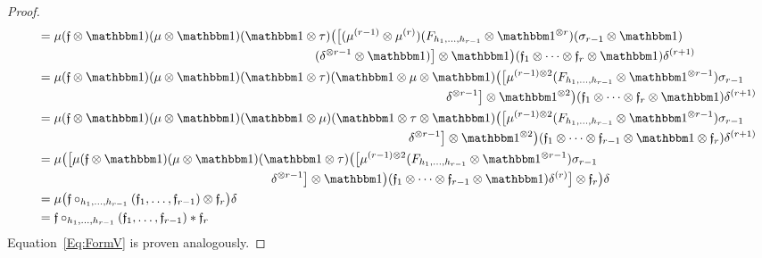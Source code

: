 \documentclass[\MainFolder/Text.tex]{subfiles}
\begin{document}
\begin{proof}
\begin{align*}
&\quad=\begin{multlined}[t]\MVProd(\MVMorF\otimes\Id)(\MVProd\otimes\Id)(\Id\otimes\tau)\bigl(\bigl[(\MVProd^{(r-1)}\otimes\MVProd^{(r)})(F_{h_1,\dotsc,h_{r-1}}\otimes\Id^{\otimes r})(\sigma_{r-1}\otimes\Id)\\ (\MVCoProd^{\otimes r-1}\otimes\Id)\bigr]\otimes\Id\bigr)(\MVMorF_1\otimes\dotsb\otimes\MVMorF_{r}\otimes\Id)\MVCoProd^{(r+1)}\end{multlined}\\
&\quad=\begin{multlined}[t]\MVProd(\MVMorF\otimes\Id)(\MVProd\otimes\Id)(\Id\otimes\tau)(\Id\otimes\MVProd\otimes\Id)\bigl(\bigr[\MVProd^{(r-1)\otimes 2}(F_{h_1,\dotsc,h_{r-1}}\otimes\Id^{\otimes r-1})\sigma_{r-1}\\\MVCoProd^{\otimes r-1}\bigr]\otimes \Id^{\otimes 2}\bigr)(\MVMorF_1\otimes\dotsb\otimes\MVMorF_{r}\otimes\Id)\MVCoProd^{(r+1)}\end{multlined}\\
&\quad=\begin{multlined}[t]\MVProd(\MVMorF\otimes\Id)(\MVProd\otimes\Id)(\Id\otimes\MVProd)(\Id\otimes\tau\otimes\Id)\bigl(\bigr[\MVProd^{(r-1)\otimes 2}(F_{h_1,\dotsc,h_{r-1}}\otimes\Id^{\otimes r-1})\sigma_{r-1}\\\MVCoProd^{\otimes r-1}\bigr]\otimes \Id^{\otimes 2}\bigr)(\MVMorF_1\otimes\dotsb\otimes\MVMorF_{r-1}\otimes\Id\otimes\MVMorF_{r})\MVCoProd^{(r+1)}\end{multlined}\\
&\quad=\begin{multlined}[t]\MVProd\bigl(\bigl[\MVProd(\MVMorF\otimes\Id)(\MVProd\otimes\Id)(\Id\otimes\tau)\bigl(\bigl[\MVProd^{(r-1)\otimes 2}(F_{h_1,\dotsc,h_{r-1}}\otimes\Id^{\otimes r-1})\sigma_{r-1} \\ \MVCoProd^{\otimes r-1}\bigr]\otimes\Id\bigr)(\MVMorF_1\otimes\dotsb\otimes\MVMorF_{r-1}\otimes\Id)\MVCoProd^{(r)}\bigr]\otimes\MVMorF_r\bigr)\MVCoProd\end{multlined}\\
&\quad=\MVProd\bigl(\MVMorF\circ_{h_1,\dotsc,h_{r-1}}(\MVMorF_1,\dotsc,\MVMorF_{r-1})\otimes\MVMorF_r\bigr)\MVCoProd \\
&\quad= \MVMorF\circ_{h_1,\dotsc,h_{r-1}}(\MVMorF_1,\dotsc,\MVMorF_{r-1})\Star \MVMorF_r
\end{align*}
Equation~\eqref{Eq:FormV} is proven analogously.

\end{proof}
\end{document}
